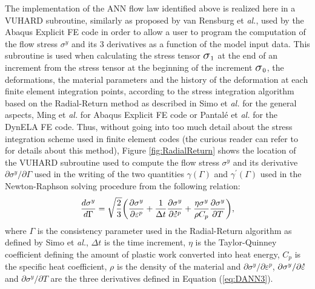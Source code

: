 \documentclass[algorithms,article,submit,pdftex,moreauthors]{Definitions/mdpi}
\makeatletter
\DeclareRobustCommand{\Sig}{\mbox{\Large\ensuremath{\sigma}}}
\DeclareRobustCommand{\mdot}[1]{\accentset{\mbox{\bfseries .}}{#1}}
\DeclareRobustCommand{\eal}{et \emph{al.}\@\xspace}
\makeatother
\begin{document}
The implementation of the ANN flow law identified above is realized here in a VUHARD subroutine, similarly as proposed by van Rensburg \eal \cite{JansenVanRensburg-2012}, used by the Abaqus Explicit FE code in order to allow a user to program the computation of the flow stress $\sigma^y$ and its 3 derivatives as a function of the model input data.
This subroutine is used when calculating the stress tensor $\Sig_1$ at the end of an increment from the stress tensor at the beginning of the increment $\Sig_0$, the deformations, the material parameters and the history of the deformation at each finite element integration points, according to the stress integration algorithm based on the Radial-Return method as described in Simo \eal \cite{Simo-1998} for the general aspects, Ming \eal \cite{Ming-2018} for Abaqus Explicit FE code or Pantalé \eal \cite{Pantale-2004} for the DynELA FE code.
Thus, without going into too much detail about the stress integration scheme used in finite element codes (the curious reader can refer to \cite{Ponthot-2002, Ming-2018, Pantale-2004, Liang-2022} for details about this method), Figure \ref{fig:RadialReturn} shows the location of the VUHARD subroutine used to compute the flow stress $\sigma^y$ and its derivative $\partial\sigma^y/\partial\Gamma$ used in the writing of the two quantities $\gamma(\Gamma)$ and $\gamma^{'}(\Gamma)$ used in the Newton-Raphson solving procedure from the following relation:
\begin{equation}
\frac{d\sigma^{y}}{d\Gamma} = \sqrt{\frac{2}{3}}\left(\frac{\partial\sigma^{y}}{\partial\varepsilon^{p}}+\frac{1}{\Delta t}\frac{\partial\sigma^{y}}{\partial\mdot{\varepsilon}^p}+\frac{\eta\sigma^{y}}{\rho C_{p}}\frac{\partial\sigma^{y}}{\partial T}\right)\label{eq:derivatives},
\end{equation}
where $\Gamma$ is the consistency parameter used in the Radial-Return algorithm as defined by Simo \eal \cite{Simo-1998}, $\Delta t$ is the time increment, $\eta$ is the Taylor-Quinney coefficient defining the amount of plastic work converted into heat energy, $C_{p}$ is the specific heat coefficient, $\rho$ is the density of the material and $\partial \sigma^y/\partial\varepsilon^p$, $\partial \sigma^y/\partial\mdot\varepsilon$ and $\partial \sigma^y/\partial T$ are the three derivatives defined in Equation (\ref{eq:DANN3}).
\end{document}

